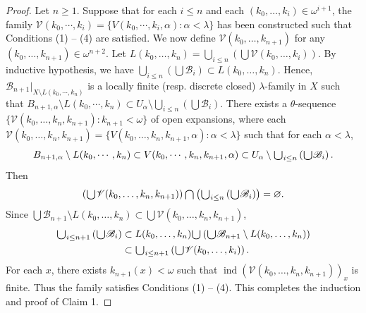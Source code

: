 \documentclass[main.tex]{subfiles}
\begin{document}
\begin{proof}
 Let $n \ge 1$. Suppose that for each $i \le n$ and each $(k_0, \dots, k_i)\in\omega^{i+1}$, the family 
 $\mathscr{V}(k_0, \cdots, k_i) = \{V(k_0, \cdots, k_i, \alpha): \alpha < \lambda\}$ 
 has been constructed such that Conditions (1) -- (4) are satisfied. 
 We now define $\mathscr{V}(k_0, \dots, k_{n+1})$ for any 
 $(k_0, \dots, k_{n+1}) \in \omega^{n+2}$. 
 Let $L(k_0, \dots, k_n)=\bigcup_{i\le n}(\bigcup \mathscr{V}(k_0, \dots, k_i))$. 
 By inductive hypothesis, we have 
 $\bigcup_{i\le n}(\bigcup \mathscr{B}_i)\subset L(k_0, \dots, k_n)$. 
 Hence, $\mathscr{B}_{n+1}|_{X\setminus L(k_0,\cdots, k_n)}$ 
 is a locally finite (resp. discrete closed) $\lambda$-family in $X$ such that 
 $B_{n+1, \alpha}\setminus  L(k_0,\cdots, k_n)\subset 
 U_\alpha \setminus \bigcup_{i\le n}(\bigcup \mathscr{B}_i)$.
 There exists a $\theta$-sequence 
 $\{\mathscr{V}(k_0, \dots, k_n, k_{n+1}): k_{n+1} < \omega\}$ of open expansions,
 where each 
 $\mathscr{V}(k_0, \dots, k_n, k_{n+1}) = 
 \{V(k_0, \dots, k_n, k_{n+1}, \alpha): \alpha<\lambda\}$
 such that for each $\alpha < \lambda$,
 $$B_{n+1, \alpha}\setminus  L(k_0,\cdots, k_n)\subset 
 V(k_0,\cdots, k_n, k_{n+1}, \alpha) \subset
 U_\alpha \setminus  \raisebox{-2pt}{\scalebox{1.5}{$\cup$}}_{i\le n}\left(\raisebox{-2pt}{\scalebox{1.5}{$\cup$}} \mathscr{B}_i\right).$$
Then 
$$\left(\raisebox{-2pt}{\scalebox{1.5}{$\cup$}} \mathscr{V}(k_0, \dots, k_n, k_{n+1})\right) \raisebox{-2pt}{\scalebox{1.5}{$\cap$}} 
\left(\raisebox{-2pt}{\scalebox{1.5}{$\cup$}}_{i\le n}\left(\raisebox{-2pt}{\scalebox{1.5}{$\cup$}} \mathscr{B}_i\right)\right) = \varnothing.$$
Since $\bigcup \mathscr{B}_{n+1} \setminus L(k_0, \dots, k_n) \subset
\bigcup \mathscr{V}(k_0, \dots, k_n, k_{n+1})$,
\begin{equation*}
\begin{aligned}
 \raisebox{-2pt}{\scalebox{1.5}{$\cup$}}_{i\le n+1}\left(\raisebox{-2pt}{\scalebox{1.5}{$\cup$}} \mathscr{B}_{i}\right) &\subset L(k_0, \dots, k_n) \raisebox{-2pt}{\scalebox{1.5}{$\cup$}} 
                    \left(\raisebox{-2pt}{\scalebox{1.5}{$\cup$}} \mathscr{B}_{n+1}\setminus L(k_0, \dots, k_n)\right) \\
                    &\subset \raisebox{-2pt}{\scalebox{1.5}{$\cup$}}_{i\le n+1}\left(\raisebox{-2pt}{\scalebox{1.5}{$\cup$}} \mathscr{V}(k_0, \dots, k_i)\right).
\end{aligned}
\end{equation*}
For each $x$, there exists $k_{n+1}(x) < \omega$ such that 
$\operatorname{ind}( \mathscr{V}(k_0, \dots, k_n, k_{n+1}))_x$ 
is finite. Thus the family satisfies Conditions (1) -- (4). This completes the induction and proof 
of Claim 1. 


\end{proof}
\end{document}
